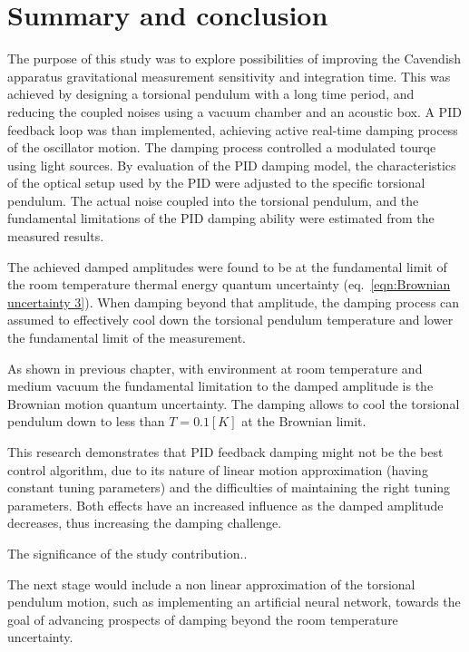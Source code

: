 \documentclass[\main/master.tex]{subfiles}
\begin{document}
\newspacing
\chapter{Summary and conclusion}\label{chapter:Summary and conclusion}
The purpose of this study was to explore possibilities of improving the Cavendish apparatus gravitational measurement sensitivity and integration time. This was achieved by designing a torsional pendulum with a long time period, and reducing the coupled noises using a vacuum chamber and an acoustic box. A PID feedback loop was than implemented, achieving active real-time damping process of the oscillator motion. The damping process controlled a modulated tourqe using light sources. By evaluation of the PID damping model, the characteristics of the optical setup used by the PID were adjusted to the specific torsional pendulum. The actual noise coupled into the torsional pendulum, and the fundamental limitations of the PID damping ability were estimated from the measured results.
\par\noindent
The achieved damped amplitudes were found to be at the fundamental limit of the room temperature thermal energy quantum uncertainty (eq.~\ref{eqn:Brownian uncertainty 3}). When damping beyond that amplitude, the damping process can assumed to effectively cool down the torsional pendulum temperature and lower the fundamental limit of the measurement. 
\par\noindent
As shown in previous chapter, with environment at room temperature and medium vacuum the fundamental limitation to the damped amplitude is the Brownian motion quantum uncertainty. The damping allows to cool the torsional pendulum down to less than $T=0.1[K]$ at the Brownian limit.
\par\noindent
This research demonstrates that PID feedback damping might not be the best control algorithm, due to its nature of linear motion approximation (having constant tuning parameters) and the difficulties of maintaining the right tuning parameters. Both effects have an increased influence as the damped amplitude decreases, thus increasing the damping challenge.
\par\noindent
The significance of the study contribution..

\par\noindent
The next stage would include a non linear approximation of the torsional pendulum motion, such as implementing an artificial neural network, towards the goal of advancing prospects of damping beyond the room temperature uncertainty. 
\end{document}
